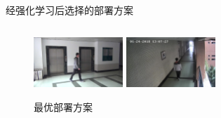 \begin{frame}{经强化学习后选择的部署方案}
\begin{columns}
\begin{column}{0.5\textwidth}
\begin{figure}
            \includegraphics[width=0.3\textwidth]{figures/3-2}
            \includegraphics[width=0.3\textwidth]{figures/3-6}
            \caption{最优部署方案}
            \label{fig:rlresult}
            \end{figure}
        \end{column}
    \end{columns}
    \end{frame}

